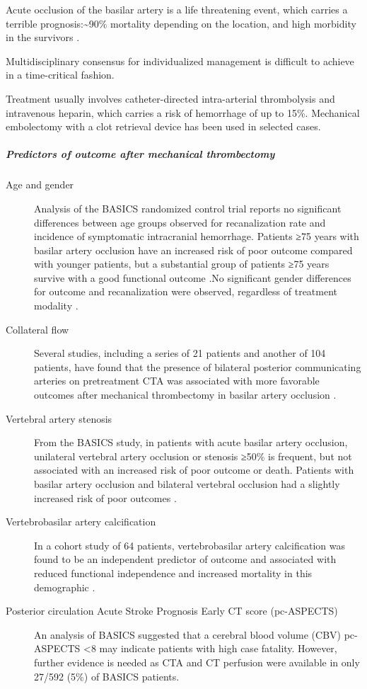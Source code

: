 Acute occlusion of the basilar artery is a life threatening event, which carries a terrible prognosis:\textasciitilde90\% mortality depending on the location, and high morbidity in the survivors .

Multidisciplinary consensus for individualized management is difficult to achieve in a time-critical fashion.

Treatment usually involves catheter-directed intra-arterial thrombolysis and intravenous heparin, which carries a risk of hemorrhage of up to 15\%. Mechanical embolectomy with a clot retrieval device has been used in selected cases.

\subparagraph{Predictors of outcome after mechanical thrombectomy}
\begin{description}
	\item[Age and gender] Analysis of the BASICS randomized control trial reports no significant differences between age groups observed for recanalization rate and incidence of symptomatic intracranial hemorrhage. Patients ≥75 years with basilar artery occlusion have an increased risk of poor outcome compared with younger patients, but a substantial group of patients ≥75 years survive with a good functional outcome .No significant gender differences for outcome and recanalization were observed, regardless of treatment modality .
	
	\item[Collateral flow] Several studies, including a series of 21 patients and another of 104 patients, have found that the presence of bilateral posterior communicating arteries on pretreatment CTA was associated with more favorable outcomes after mechanical thrombectomy in basilar artery occlusion .
	
	\item[Vertebral artery stenosis] From the BASICS study, in patients with acute basilar artery occlusion, unilateral vertebral artery occlusion or stenosis ≥50\% is frequent, but not associated with an increased risk of poor outcome or death. Patients with basilar artery occlusion and bilateral vertebral occlusion had a slightly increased risk of poor outcomes .
	
	\item[Vertebrobasilar artery calcification] In a cohort study of 64 patients, vertebrobasilar artery calcification was found to be an independent predictor of outcome and associated with reduced functional independence and increased mortality in this demographic .
	
	\item[Posterior circulation Acute Stroke Prognosis Early CT score (pc-ASPECTS)] An analysis of BASICS suggested that a cerebral blood volume (CBV) pc-ASPECTS \textless8 may indicate patients with high case fatality. However, further evidence is needed as CTA and CT perfusion were available in only 27/592 (5\%) of BASICS patients.
\end{description}

